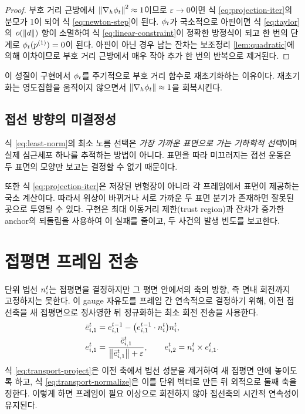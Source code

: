 \begin{proof}
부호 거리 근방에서 $\left\lVert \nabla_h\phi_t \right\rVert^2\approx1$이므로 $\varepsilon\to0$이면 식
\eqref{eq:projection-iter}의 분모가 1이 되어 식 \eqref{eq:newton-step}이 된다.
$\phi_t$가 국소적으로 아핀이면 식 \eqref{eq:taylor}의 $o(\left\lVert d \right\rVert)$ 항이 소멸하여 식
\eqref{eq:linear-constraint}이 정확한 방정식이 되고 한 번의 단계로
$\phi_t(p^{(1)})=0$이 된다. 아핀이 아닌 경우 남는 잔차는 보조정리
\ref{lem:quadratic}에 의해 이차이므로 부호 거리 근방에서 매우 작아 추가 한 번의
반복으로 제거된다.
\end{proof}

이 성질이 구현에서 $\phi_t$를 주기적으로 부호 거리 함수로 재초기화하는 이유이다.
재초기화는 영도집합을 움직이지 않으면서 $\left\lVert \nabla_h\phi_t \right\rVert\approx1$을 회복시킨다.

\subsection{접선 방향의 미결정성}
\label{sec:tangential}

식 \eqref{eq:least-norm}의 최소 노름 선택은 \emph{가장 가까운 표면으로 가는 기하학적
선택}이며 실제 심근세포 하나를 추적하는 방법이 아니다. 표면을 따라 미끄러지는 접선
운동은 두 표면의 모양만 보고는 결정할 수 없기 때문이다.


또한 식 \eqref{eq:projection-iter}은 저장된 변형장이 아니라 각 프레임에서 표면이
제공하는 국소 계산이다. 따라서 위상이 바뀌거나 서로 가까운 두 표면 분기가 존재하면
잘못된 곳으로 투영될 수 있다. 구현은 최대 이동거리 제한(trust region)과 잔차가
증가한 anchor의 되돌림을 사용하여 이 실패를 줄이고, 두 사건의 발생 빈도를 보고한다.

\section{접평면 프레임 전송}
\label{sec:transport}

단위 법선 $n^t_i$는 접평면을 결정하지만 그 평면 안에서의 축의 방향, 즉 면내
회전까지 고정하지는 못한다. 이 gauge 자유도를 프레임 간 연속적으로 결정하기 위해,
이전 접선축을 새 접평면으로 정사영한 뒤 정규화하는 최소 회전 전송을 사용한다.
\begin{align}
  \bar e^t_{i,1} &= e^{t-1}_{i,1} - \bigl(e^{t-1}_{i,1}\cdot n^t_i\bigr)n^t_i,
  \label{eq:transport-project}\\
  e^t_{i,1} &= \frac{\bar e^t_{i,1}}{\left\lVert \bar e^t_{i,1} \right\rVert+\varepsilon},
  \qquad
  e^t_{i,2} = n^t_i \times e^t_{i,1}.
  \label{eq:transport-normalize}
\end{align}
식 \eqref{eq:transport-project}은 이전 축에서 법선 성분을 제거하여 새 접평면 안에
놓이도록 하고, 식 \eqref{eq:transport-normalize}은 이를 단위 벡터로 만든 뒤 외적으로
둘째 축을 정한다. 이렇게 하면 프레임이 필요 이상으로 회전하지 않아 접선축의 시간적
연속성이 유지된다.

